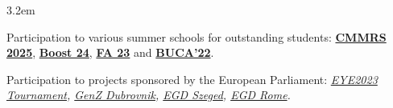 \begin{datetabular}{3.2em}
{\hspace{0.5em}{\tiny $\raisebox{1px}{\bullet}$}\hspace{0.2em}  Participation to various summer schools for outstanding students: \textbf{\href{https://cmmrs.mpi-sws.org/}{CMMRS 2025}}, \textbf{\href{https://boost24.elicsir.it/home/}{Boost 24}}, \textbf{\href{https://fa23.bici.events/}{FA 23}} and \textbf{\href{https://buca22.bici.events/home}{BUCA’22}}. 

\hspace{0.5em}{\tiny $\raisebox{1px}{\bullet}$}\hspace{0.2em}
Participation to projects sponsored by the European Parliament: \textit{\href{https://www.linkedin.com/posts/luigipizza_eye2023-strasbourg-activecitizenship-activity-7140668305626902528-aroh}{EYE2023 Tournament}, \href{https://www.euchangemakers.com/genz-dubrovnik-croatia}{GenZ Dubrovnik}, \href{https://www.euchangemakers.com/egdszeged}{EGD Szeged}, \href{https://www.euchangemakers.com/egdrome}{EGD Rome}.}
}





\end{datetabular}